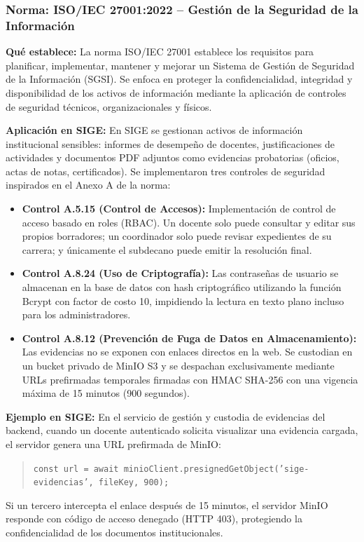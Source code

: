 \documentclass[12pt,a4paper]{article}
\begin{document}
\subsubsection{Norma: ISO/IEC 27001:2022 -- Gestión de la Seguridad de la Información}

\textbf{Qué establece:}
La norma ISO/IEC 27001 establece los requisitos para planificar, implementar, mantener y mejorar un Sistema de Gestión de Seguridad de la Información (SGSI). Se enfoca en proteger la confidencialidad, integridad y disponibilidad de los activos de información mediante la aplicación de controles de seguridad técnicos, organizacionales y físicos.

\textbf{Aplicación en SIGE:}
En SIGE se gestionan activos de información institucional sensibles: informes de desempeño de docentes, justificaciones de actividades y documentos PDF adjuntos como evidencias probatorias (oficios, actas de notas, certificados). Se implementaron tres controles de seguridad inspirados en el Anexo A de la norma:
\begin{itemize}[leftmargin=1.5em, itemsep=2pt]
    \item \textbf{Control A.5.15 (Control de Accesos):} Implementación de control de acceso basado en roles (RBAC). Un docente solo puede consultar y editar sus propios borradores; un coordinador solo puede revisar expedientes de su carrera; y únicamente el subdecano puede emitir la resolución final.
    \item \textbf{Control A.8.24 (Uso de Criptografía):} Las contraseñas de usuario se almacenan en la base de datos con hash criptográfico utilizando la función Bcrypt con factor de costo 10, impidiendo la lectura en texto plano incluso para los administradores.
    \item \textbf{Control A.8.12 (Prevención de Fuga de Datos en Almacenamiento):} Las evidencias no se exponen con enlaces directos en la web. Se custodian en un bucket privado de MinIO S3 y se despachan exclusivamente mediante URLs prefirmadas temporales firmadas con HMAC SHA-256 con una vigencia máxima de 15 minutos (900 segundos).
\end{itemize}

\textbf{Ejemplo en SIGE:}
En el servicio de gestión y custodia de evidencias del backend, cuando un docente autenticado solicita visualizar una evidencia cargada, el servidor genera una URL prefirmada de MinIO:
\begin{quote}
\texttt{const url = await minioClient.presignedGetObject('sige-evidencias', fileKey, 900);}
\end{quote}
Si un tercero intercepta el enlace después de 15 minutos, el servidor MinIO responde con código de acceso denegado (HTTP 403), protegiendo la confidencialidad de los documentos institucionales.
\end{document}
